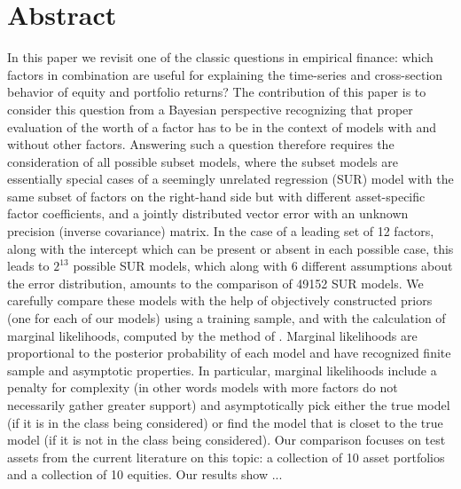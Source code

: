 \documentclass[12pt]{article}
\begin{document}
\section{Abstract}
    In this paper we revisit one of the classic questions in empirical finance: which factors in combination are useful for explaining the time-series and cross-section behavior of equity and portfolio returns? The contribution of this paper is to consider this question from a Bayesian perspective recognizing that proper evaluation of the worth of a factor has to be in the context of models with and without other factors. Answering such a question therefore requires the consideration of all possible subset models, where the subset models are essentially special cases of a seemingly unrelated regression (SUR) model with the same subset of factors on the right-hand side but with different asset-specific factor coefficients, and a jointly distributed vector error with an unknown precision (inverse covariance) matrix. In the case of a leading set of 12 factors, along with the intercept which can be present or absent in each possible case, this leads to $2^{13}$ possible SUR models, which along with 6 different assumptions about the error distribution, amounts to the comparison of 49152 SUR models. We carefully compare these models with the help of objectively constructed priors (one for each of our models) using a training sample, and with the calculation of marginal likelihoods, computed by the method of \cite{chib1995marginal}. Marginal likelihoods are proportional to the posterior probability of each model and have recognized finite sample and asymptotic properties. In particular, marginal likelihoods include a penalty for complexity (in other words models with more factors do not necessarily gather greater support) and asymptotically pick either the true model (if it is in the class being considered) or find the model that is closet to the true model (if it is not in the class being considered). Our comparison focuses on test assets from the current literature on this topic: a collection of 10 asset portfolios and a collection of 10 equities. Our results show ...
\end{document}
